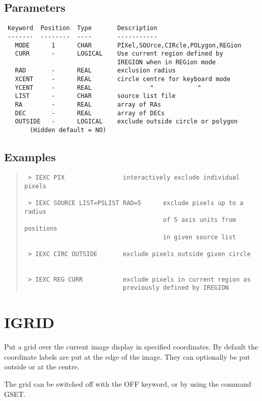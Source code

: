 \documentclass{book}
\renewcommand{\_}{{\tt\char'137}}     %
\begin{document}
\subsection{Parameters}
\begin{verbatim}
 Keyword  Position  Type       Description
 -------  --------  ----       -----------
   MODE      1      CHAR       PIXel,SOUrce,CIRcle,POLygon,REGion
   CURR      -      LOGICAL    Use current region defined by
                               IREGION when in REGion mode
   RAD       -      REAL       exclusion radius
   XCENT     -      REAL       circle centre for keyboard mode
   YCENT     -      REAL                "            "
   LIST      -      CHAR       source list file
   RA        -      REAL       array of RAs
   DEC       -      REAL       array of DECs
   OUTSIDE   -      LOGICAL    exclude outside circle or polygon
       (Hidden default = NO)

\end{verbatim}\subsection{Examples}
\begin{quote}\begin{verbatim}
 > IEXC PIX                interactively exclude individual pixels

 > IEXC SOURCE LIST=PSLIST RAD=5      exclude pixels up to a radius
                                      of 5 axis units from positions
                                      in given source list

 > IEXC CIRC OUTSIDE       exclude pixels outside given circle


 > IEXC REG CURR           exclude pixels in current region as
                           previously defined by IREGION
 \end{verbatim}\end{quote}
\section{IGRID}
Put a grid over the current image display in specified coordinates.
By default the coordinate labels are put at the edge of the image.
They can optionally be put outside or at the centre.

The grid can be switched off with the OFF keyword, or by using
the command GSET.
\end{document}
